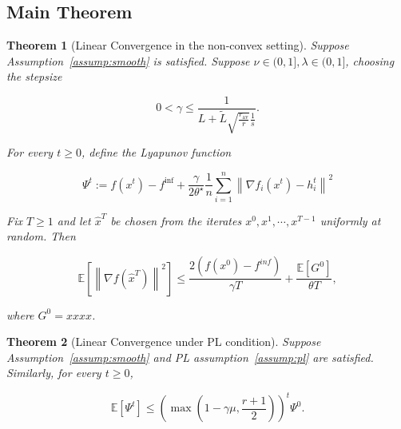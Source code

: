 \documentclass{article} %
\theoremstyle{plain}
\newtheorem{theorem}{Theorem}[section]
\theoremstyle{definition}
\theoremstyle{remark}
\begin{document}
\subsection{Main Theorem}
\begin{theorem}[Linear Convergence in the non-convex setting]\label{thm:main}
   Suppose Assumption~\ref{assump:smooth} is satisfied. Suppose $\nu\in (0, 1], \lambda\in (0,1]$, choosing the stepsize 
   
   $$0< \gamma \leq \frac{1}{L + \tilde{L}\sqrt{\frac{r_{\mathrm{av}}}{r}}\frac{1}{s}}.$$

   For every $t\geq 0$, define the Lyapunov function

   \begin{equation}
      \Psi^{t}:=f\left(x^{t}\right)-f^{\inf}+\frac{\gamma}{2 \theta^{\star}} \frac{1}{n} \sum_{i=1}^{n}\left\|\nabla f_{i}\left(x^{t}\right)-h_{i}^{t}\right\|^{2}
      \end{equation}
   
   Fix $T\geq 1$ and let $\hat{x}^T$ be chosen from the iterates $x^0, x^1, \cdots, x^{T-1}$ uniformly at random. Then 

   \begin{equation}
      \mathbb{E}\left[\left\|\nabla f\left(\hat{x}^{T}\right)\right\|^{2}\right] \leq \frac{2\left(f\left(x^{0}\right)-f^{i n f}\right)}{\gamma T}+\frac{\mathbb{E}\left[G^{0}\right]}{\theta T},
      \end{equation}

   where $G^0=xxxx$.
\end{theorem}

\begin{theorem}[Linear Convergence under PL condition]\label{thm:main_pl}
   Suppose Assumption~\ref{assump:smooth} and PL assumption~\ref{assump:pl} are satisfied. Similarly, for every $t\geq 0$, 

   \begin{equation}
      \mathbb{E}\left[\Psi^{t}\right] \leq\left(\max \left(1-\gamma \mu, \frac{r+1}{2}\right)\right)^{t} \Psi^{0}.
      \end{equation}
\end{theorem}
\end{document}
